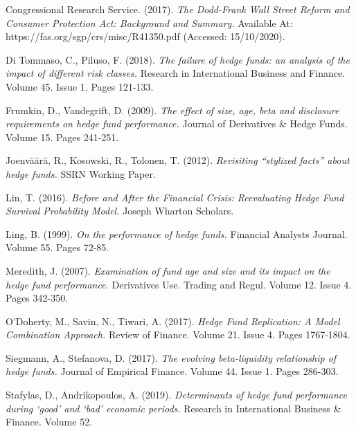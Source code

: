 \documentclass[11pt, english]{article}
\begin{document}
\begin{thebibliography}{9}

		Congressional Research Service. (2017).
		\textsl{The Dodd-Frank Wall Street Reform and Consumer Protection Act: Background and Summary.}
		Available At:
		https://fas.org/sgp/crs/misc/R41350.pdf
		(Accessed: 15/10/2020).

		Di Tommaso, C., Piluso, F. (2018).
		\textsl{The failure of hedge funds: an analysis of the impact of different risk classes.}
		Research in International Business and Finance. Volume 45. Issue 1. Pages 121-133.

                Frumkin, D., Vandegrift, D. (2009). 
                \textsl{The effect of size, age, beta and disclosure requirements on hedge fund performance.}
		Journal of Derivatives \& Hedge Funds. Volume 15. Pages 241-251.

                Joenv\"{a}\"{a}r\"{a}, R., Kosowski, R., Tolonen, T. (2012).
                \textsl{Revisiting ``stylized facts'' about hedge funds.}
		SSRN Working Paper.

                Lin, T. (2016). 
                \textsl{Before and After the Financial Crisis: Reevaluating Hedge Fund Survival Probability Model.}
		Joseph Wharton Scholars.

                Ling, B. (1999). 
                \textsl{On the performance of hedge funds.}
		Financial Analysts Journal. Volume 55. Pages 72-85.

                Meredith, J. (2007).
                \textsl{Examination of fund age and size and its impact on the hedge fund performance.}
		Derivatives Use. Trading and Regul. Volume 12. Issue 4. Pages 342-350.

                O’Doherty, M., Savin, N., Tiwari, A. (2017).
                \textsl{Hedge Fund Replication: A Model Combination Approach.}
		Review of Finance. Volume 21. Issue 4. Pages 1767-1804.

                Siegmann, A., Stefanova, D. (2017). 
                \textsl{The evolving beta-liquidity relationship of hedge funds.}
		Journal of Empirical Finance. Volume 44. Issue 1. Pages 286-303.

                Stafylas, D., Andrikopoulos, A. (2019).
                \textsl{Determinants of hedge fund performance during ‘good’ and ‘bad’ economic periods.}
		Research in International Business \& Finance. Volume 52.


\end{thebibliography}
\end{document}
